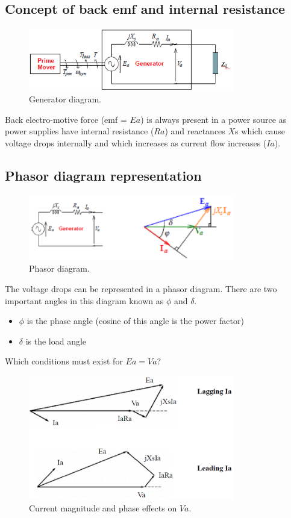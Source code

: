 \subsection{Concept of back emf and internal resistance}
\begin{figure}[H]
    \centering
    \includegraphics[width = 0.8\textwidth]{img/figure75.png}
    \caption{Generator diagram.}
\end{figure}
Back electro-motive force (emf = $Ea$) is always present in a power source as power supplies have internal resistance ($Ra$) and reactances $X$s which cause voltage drops internally and which increases as current flow increases ($Ia$).
\subsection{Phasor diagram representation}
\begin{figure}[H]
    \centering
    \includegraphics[width = 0.8\textwidth]{img/figure76.png}
    \caption{Phasor diagram.}
\end{figure}
The voltage drops can be represented in a phasor diagram. There are two important angles in this diagram known as $\phi$ and $\delta$.
\begin{itemize}
    \item $\phi$ is the phase angle (cosine of this angle is the power factor)
    \item $\delta$ is the load angle
\end{itemize}
Which conditions must exist for $Ea = Va$?
\begin{figure}[H]
    \centering
    \includegraphics[width = 0.8\textwidth]{img/figure77.png}
    \caption{Current magnitude and phase effects on $Va$.}
\end{figure}

